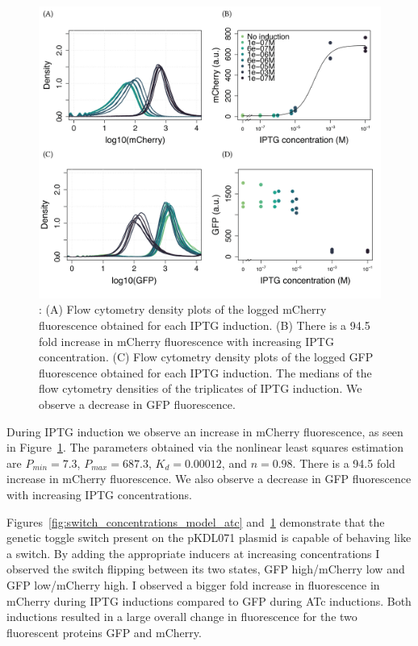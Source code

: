 \begin{figure}[tb]
	\begin{center}
\includegraphics[width=\textwidth]{../../chapters/chapterABCFlow/images/pKDL071_concentrations_model_fit-01.png}
\caption[LoF caption]{\label{fig:switch_concentrations_model}:  (A) Flow cytometry density plots of the logged mCherry fluorescence obtained for each IPTG induction. (B) There is a 94.5 fold increase in mCherry fluorescence with increasing IPTG concentration. (C) Flow cytometry density plots of the logged GFP fluorescence obtained for each IPTG induction. The medians of the flow cytometry densities of the triplicates of IPTG induction. We observe a decrease in GFP fluorescence. }
\end{center}
\end{figure}


During IPTG induction we observe an increase in mCherry fluorescence, as seen in Figure~\ref{fig:switch_concentrations_model}. The parameters obtained via the nonlinear least squares estimation are $P_{min} = 7.3$, $P_{max}=687.3$, $K_d=0.00012$, and $n=0.98$. There is a 94.5 fold increase in mCherry fluorescence.  We also observe a decrease in GFP fluorescence with increasing IPTG concentrations. 

Figures~\ref{fig:switch_concentrations_model_atc} and~\ref{fig:switch_concentrations_model} demonstrate that the genetic toggle switch present on the pKDL071 plasmid is capable of behaving like a switch. By adding the appropriate inducers at increasing concentrations I observed the switch flipping between its two states, GFP high/mCherry low and GFP low/mCherry high. I observed a bigger fold increase in fluorescence in mCherry during IPTG inductions compared to GFP during ATc inductions. Both inductions resulted in a large overall change in fluorescence for the two fluorescent proteins GFP and mCherry. 


